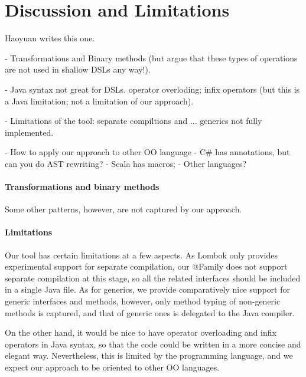 \section{Discussion and Limitations}

Haoyuan writes this one.

- Transformations and Binary methods (but argue that
these types of operations are not used in shallow DSLs
any way!).

- Java syntax not great for DSLs.
operator overloding; infix operators (but this is a Java limitation;
not a limitation of our approach).

- Limitations of the tool: separate compiltions and ...
generics not fully implemented.

- How to apply our approach to other OO language
  - C\# has annotations, but can you do AST rewriting?
  - Scala has macros;
  - Other languages?



\paragraph{Transformations and binary methods} Some other patterns, however, are not captured by our approach.
  
\paragraph{Limitations} Our tool has certain limitations at a few aspects. As Lombok only provides experimental support
for separate compilation, our \textsf{@Family} does not support separate compilation at this stage, so all the related
interfaces should be included in a single Java file. As for generics, we provide comparatively nice support for generic interfaces
and methods, however, only method typing of non-generic methods is captured, and that of generic ones is delegated to the Java compiler.

On the other hand, it would be nice to have operator overloading and infix operators in Java syntax, so that the code could be
written in a more concise and elegant way. Nevertheless, this is limited by the programming language, and we expect our approach to be oriented to
other OO languages.
